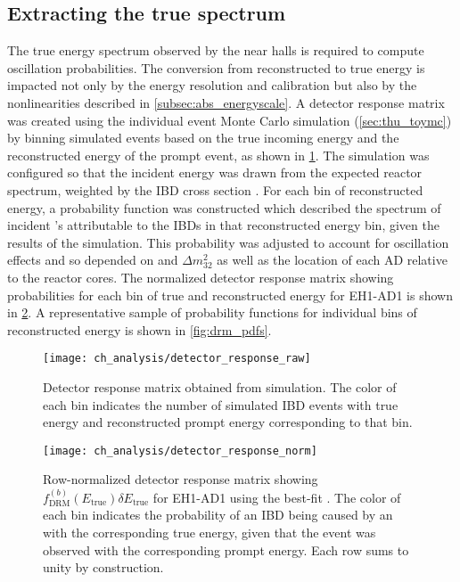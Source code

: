 \subsection{Extracting the true \texorpdfstring{\nuebar{}}{antineutrino} spectrum}
\label{subsec:reco_to_true_energy}

The true \nuebar{} energy spectrum observed by the near halls
is required to compute oscillation probabilities.
The conversion from reconstructed to true energy
is impacted not only by the energy resolution and calibration
but also by the nonlinearities described in \cref{subsec:abs_energyscale}.
A detector response matrix was created
using the individual event Monte Carlo simulation (\cref{sec:thu_toymc})
by binning simulated events based on the true incoming \nuebar{} energy
and the reconstructed energy of the prompt event,
as shown in \cref{fig:drm}.
The simulation was configured so that the incident \nuebar{} energy
was drawn from the expected reactor \nuebar{} spectrum,
weighted by the IBD cross section \cite{ibd_xsec,ibd_xsec_note}.
For each bin of reconstructed energy,
a probability function was constructed
which described the spectrum of incident \nuebar{}'s
attributable to the IBDs in that reconstructed energy bin,
given the results of the simulation.
This probability was adjusted to account for
oscillation effects and so depended on \thetaot{} and $\Delta m^2_{32}${}
as well as the location of each AD relative to the reactor cores.
The normalized detector response matrix
showing probabilities for each bin of true and reconstructed energy for EH1-AD1
is shown in \cref{fig:drm_norm}.
A representative sample of probability functions
for individual bins of reconstructed energy
is shown in \cref{fig:drm_pdfs}.

\begin{figure}
    \centering
    \texttt{[image: ch\_analysis/detector\_response\_raw]}
    \caption[Detector response matrix]{
        Detector response matrix obtained from simulation.
        The color of each bin indicates the number of simulated IBD events
        with true \nuebar{} energy and reconstructed prompt energy
        corresponding to that bin.
    }
    \label{fig:drm}
\end{figure}

\begin{figure}
    \centering
    \texttt{[image: ch\_analysis/detector\_response\_norm]}
    \caption[Detector response matrix, row-normalized]{
        Row-normalized detector response matrix
        showing $f^{(b)}_\text{DRM}(E_\text{true})\delta E_\text{true}$
        for EH1-AD1 using the best-fit \thetaot{}.
        The color of each bin indicates the probability
        of an IBD being caused by an \nuebar{} with the corresponding true energy,
        given that the event was observed with the corresponding prompt energy.
        Each row sums to unity by construction.
    }
    \label{fig:drm_norm}
\end{figure}

